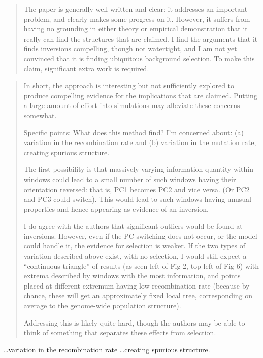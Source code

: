 \begin{quote}
    The paper is generally well written and clear; it addresses an important
    problem, and clearly makes some progress on it. However, it suffers from having
    no grounding in either theory or empirical demonstration that it really can find
    the structures that are claimed. I find the arguments that it finds inversions
    compelling, though not watertight, and I am not yet convinced that it is finding
    ubiquitous background selection.  To make this claim, significant extra work is
    required.
\end{quote}

\begin{quote}
    In short, the approach is interesting but not sufficiently explored to produce
    compelling evidence for the implications that are claimed.  Putting a large
    amount of effort into simulations may alleviate these concerns somewhat.

    Specific points: What does this method find? I'm concerned about:
    (a) variation in the recombination rate
    and (b) variation in the mutation rate, creating spurious structure.

    The first possibility is that massively varying information quantity
    within windows could lead to a small number of such windows having their
    orientation reversed: that is, PC1 becomes PC2 and vice versa. (Or PC2 and PC3
    could switch). This would lead to such windows having unusual properties and
    hence appearing as evidence of an inversion.

    I do agree with the authors that significant outliers would be found at
    inversions. However, even if the PC switching does not occur, or the model could
    handle it, the evidence for selection is weaker.  If the two types of variation
    described above exist, with no selection, I would still expect a ``continuous
    triangle'' of results (as seen left of Fig 2, top left of Fig 6) with extrema
    described by windows with the most information, and points placed at different
    extremum having low recombination rate (because by chance, these will get an
    approximately fixed local tree, corresponding on average to the genome-wide
    population structure).

    Addressing this is likely quite hard, though the authors may be able to think of
    something that separates these effects from selection.
\end{quote}


\begin{point}{}
\ldots variation in the recombination rate \ldots creating spurious structure.
\end{point}

